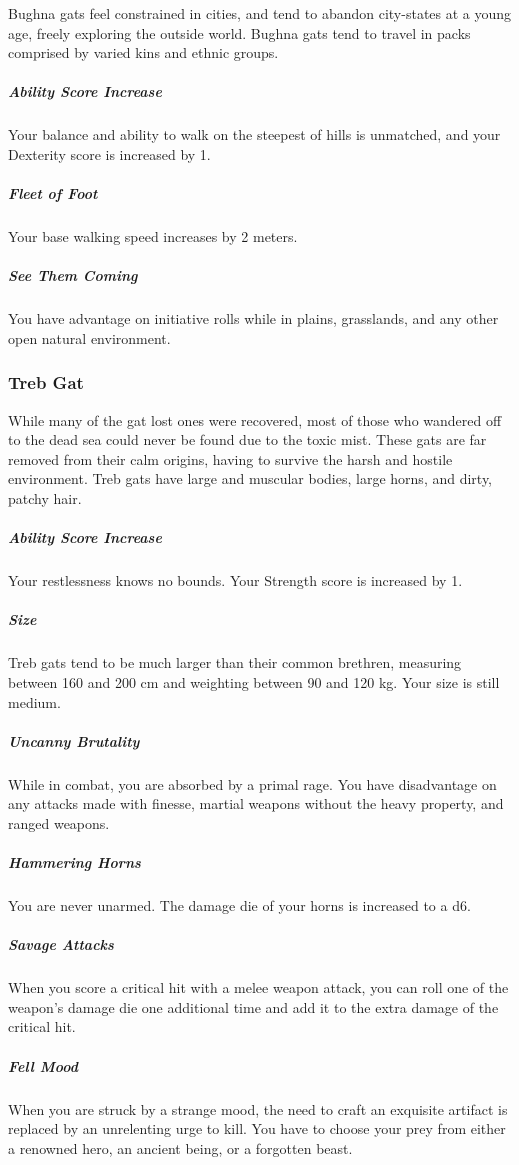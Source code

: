     Bughna gats feel constrained in cities, and tend to abandon city-states at a young age, freely exploring the outside world.
    Bughna gats tend to travel in packs comprised by varied kins and ethnic groups.

    \subparagraph{Ability Score Increase} Your balance and ability to walk on the steepest of hills is unmatched, and your Dexterity score is increased by 1.

    \subparagraph{Fleet of Foot} Your base walking speed increases by 2 meters.

    \subparagraph{See Them Coming} You have advantage on initiative rolls while in plains, grasslands, and any other open natural environment.

\subsubsection{Treb Gat}
    While many of the gat lost ones were recovered, most of those who wandered off to the dead sea could never be found due to the toxic mist.
    These gats are far removed from their calm origins, having to survive the harsh and hostile environment.
    Treb gats have large and muscular bodies, large horns, and dirty, patchy hair.

    \subparagraph{Ability Score Increase} Your restlessness knows no bounds.
    Your Strength score is increased by 1.

    \subparagraph{Size} Treb gats tend to be much larger than their common brethren, measuring between 160 and 200 cm and weighting between 90 and 120 kg.
    Your size is still medium.

    \subparagraph{Uncanny Brutality} While in combat, you are absorbed by a primal rage.
    You have disadvantage on any attacks made with finesse, martial weapons without the heavy property, and ranged weapons.

    \subparagraph{Hammering Horns} You are never unarmed.
    The damage die of your horns is increased to a d6.

    \subparagraph{Savage Attacks} When you score a critical hit with a melee weapon attack, you can roll one of the weapon's damage die one additional time and add it to the extra damage of the critical hit.

    \subparagraph{Fell Mood} When you are struck by a strange mood, the need to craft an exquisite artifact is replaced by an unrelenting urge to kill.
    You have to choose your prey from either a renowned hero, an ancient being, or a forgotten beast.

